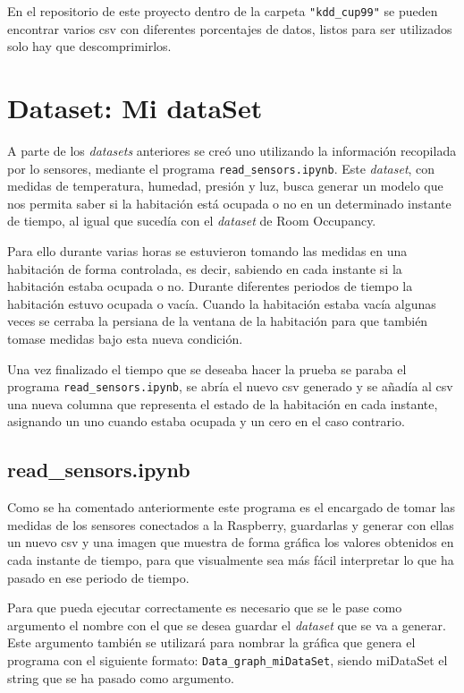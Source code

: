 \documentclass[a4paper, 12pt]{book}
\begin{document}
En el repositorio de este proyecto dentro de la carpeta \texttt{"kdd\_cup99"} se pueden encontrar varios csv con diferentes porcentajes de datos, listos para ser utilizados solo hay que descomprimirlos.

\section{Dataset: Mi dataSet}
\label{sec:mi_dataSet}

A parte de los \textit{datasets} anteriores se creó uno utilizando la información recopilada por lo sensores, mediante el programa \texttt{read\_sensors.ipynb}. Este \textit{dataset}, con medidas de temperatura, humedad, presión y luz, busca generar un modelo que nos permita saber si la habitación está ocupada o no en un determinado instante de tiempo, al igual que sucedía con el \textit{dataset} de Room Occupancy. 

Para ello durante varias horas se estuvieron tomando las medidas en una habitación de forma controlada, es decir, sabiendo en cada instante si la habitación estaba ocupada o no. Durante diferentes periodos de tiempo la habitación estuvo ocupada o vacía. Cuando la habitación estaba vacía algunas veces se cerraba la persiana de la ventana de la habitación para que también tomase medidas bajo esta nueva condición.

Una vez finalizado el tiempo que se deseaba hacer la prueba se paraba el programa \texttt{read\_sensors.ipynb}, se abría el nuevo csv generado y se añadía al csv una nueva columna que representa el estado de la habitación en cada instante, asignando un uno cuando estaba ocupada y un cero en el caso contrario.

\subsection{read\_sensors.ipynb}
\label{subsec_read_sensors}

Como se ha comentado anteriormente este programa es el encargado de tomar las medidas de los sensores conectados a la Raspberry, guardarlas y generar con ellas un nuevo csv y una imagen que muestra de forma gráfica los valores obtenidos en cada instante de tiempo, para que visualmente sea más fácil interpretar lo que ha pasado en ese periodo de tiempo. 

Para que pueda ejecutar correctamente es necesario que se le pase como argumento el nombre con el que se desea guardar el \textit{dataset} que se va a generar. Este argumento también se utilizará para nombrar la gráfica que genera el programa con el siguiente formato: \texttt{Data\_graph\_miDataSet}, siendo miDataSet el string que se ha pasado como argumento.
\end{document}

